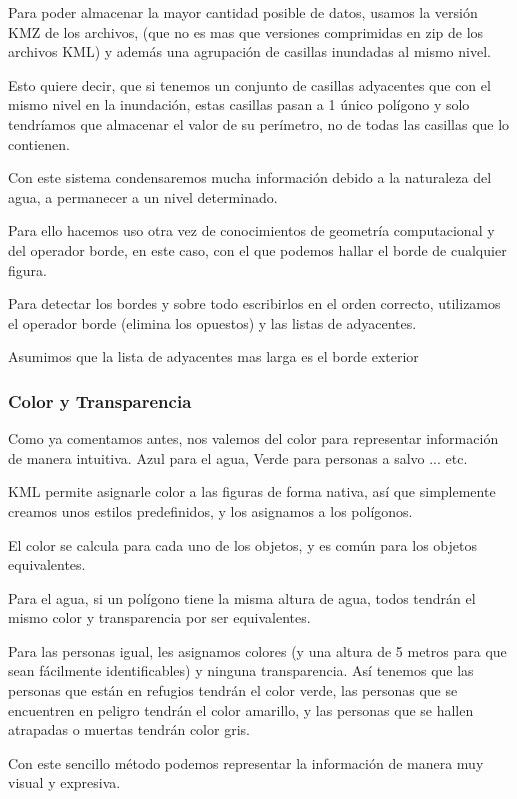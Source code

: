 Para poder almacenar la mayor cantidad posible de datos, usamos la versión KMZ
de los archivos, (que no es mas que versiones comprimidas en zip de los
archivos KML) y además una agrupación de casillas inundadas al mismo nivel.

Esto quiere decir, que si tenemos un conjunto de casillas adyacentes que con el
mismo nivel en la inundación, estas casillas pasan a 1 único polígono y solo
tendríamos que almacenar el valor de su perímetro, no de todas las casillas que
lo contienen.

Con este sistema condensaremos mucha información debido a la naturaleza del
agua, a permanecer a un nivel determinado.

Para ello hacemos uso otra vez de conocimientos de geometría computacional y
del operador borde, en este caso, con el que podemos hallar el borde de
cualquier figura.

Para detectar los bordes y sobre todo escribirlos en el orden correcto,
utilizamos el operador borde (elimina los opuestos) y las listas de adyacentes.

Asumimos que la lista de adyacentes mas larga es el borde exterior
\subsubsection*{Color y Transparencia}
Como ya comentamos antes, nos valemos del color para representar información de
manera intuitiva. Azul para el agua, Verde para personas a salvo ... etc.

KML permite asignarle color a las figuras de forma nativa, así que simplemente
creamos unos estilos predefinidos, y los asignamos a los polígonos.

El color se calcula para cada uno de los objetos, y es común para los objetos
equivalentes. 

Para el agua, si un polígono tiene la
misma altura de agua, todos tendrán el mismo color y transparencia por ser
equivalentes.

Para las personas igual, les asignamos colores (y una altura de 5 metros para
que sean fácilmente identificables) y ninguna transparencia.
Así tenemos que las personas que están en refugios tendrán el color verde, las
personas que se encuentren en peligro tendrán el color amarillo, y las personas
que se hallen atrapadas o muertas tendrán color gris.

Con este sencillo método podemos representar la información de manera muy
visual y expresiva.
